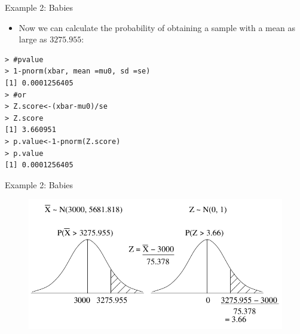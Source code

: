 \documentclass[handout]{beamer}
\begin{document}
\begin{frame}[fragile]{Example 2: Babies}
\scriptsize{

\begin{itemize}
 \item Now we can calculate the probability of obtaining a sample with a mean as large as $3275.955$:
\end{itemize}

\begin{verbatim}
> #pvalue 
> 1-pnorm(xbar, mean =mu0, sd =se)
[1] 0.0001256405
> #or
> Z.score<-(xbar-mu0)/se
> Z.score
[1] 3.660951
> p.value<-1-pnorm(Z.score)
> p.value
[1] 0.0001256405
\end{verbatim}



} 
\end{frame}


\begin{frame}[fragile]{Example 2: Babies}
\scriptsize{

 \begin{figure}[h!]
	\centering
	\includegraphics[scale=0.43]{pics/pvalue1.png}
	\caption{\cite{Marchini}}
\end{figure}




} 
\end{frame}
\end{document}
